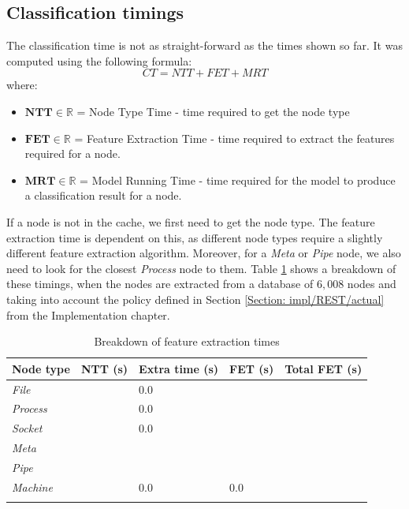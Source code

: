 		\subsection{Classification timings} \label{Section: eval/service-time/classification}
			The classification time is not as straight-forward as the times shown so far. It was computed using the following formula:
			\begin{equation}
				CT = NTT + FET + MRT
			\end{equation}
			where: 
			\begin{itemize}
				\item $\mathbf{NTT} \in \mathbb{R}$ = Node Type Time - time required to get the node type
				\item $\mathbf{FET} \in \mathbb{R}$ = Feature Extraction Time - time required to extract the features required for a node.
				\item $\mathbf{MRT} \in \mathbb{R}$ = Model Running Time - time required for the model to produce a classification result for a node.
			\end{itemize}
			If a node is not in the cache, we first need to get the node type. The feature extraction time is dependent on this, as different node types require a slightly different feature extraction algorithm. Moreover, for a \textit{Meta} or \textit{Pipe} node, we also need to look for the closest \textit{Process} node to them. Table \ref{Table: eval/service-time/classification/fet} shows a breakdown of these timings, when the nodes are extracted from a database of $6,008$ nodes and taking into account the policy defined in Section \ref{Section: impl/REST/actual} from the Implementation chapter.
			\begin{longtable}{|p{} || p{} | p{}| p{}| p{} | }
				\textbf{Node type} & \textbf{NTT} (s) & \textbf{Extra time} (s)& \textbf{FET} (s)& \textbf{Total FET} (s)\\
				\hline
				\textit{File} & & $0.0$ & & \\
				\textit{Process} & & $0.0$ & & \\
				\textit{Socket} & & $0.0$ & & \\
				\textit{Meta} & & & & \\
				\textit{Pipe} & & & & \\
				\textit{Machine} & & $0.0$ & $0.0$ & \\
				\hline
				\caption{Breakdown of feature extraction times}
				\label{Table: eval/service-time/classification/fet}
			\end{longtable}
			
